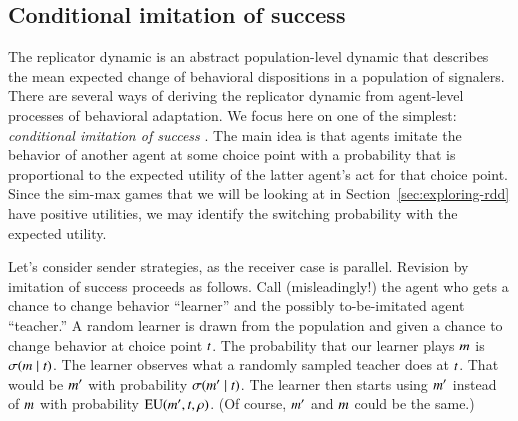 \documentclass[fleqn,reqno,10pt]{article}
\begin{document}
\subsection{Conditional imitation of success}
\label{sec:cond-imit-succ}

The replicator dynamic is an abstract population-level dynamic that describes the mean expected
change of behavioral dispositions in a population of signalers. There are several ways of
deriving the replicator dynamic from agent-level processes of behavioral adaptation. We focus
here on one of the simplest: \emph{conditional imitation of success} \citep[see][for this and
many other derivations]{Sandholm2010:Population-Game}. The main idea is that agents imitate the
behavior of another agent at some choice point with a probability that is proportional to the
expected utility of the latter agent's act for that choice point. Since the sim-max games that
we will be looking at in Section~\ref{sec:exploring-rdd} have positive utilities, we may
identify the switching probability with the expected utility.

Let's consider sender strategies, as the receiver case is parallel. Revision by imitation of
success proceeds as follows. Call (misleadingly!) the agent who gets a chance to change
behavior ``learner'' and the possibly to-be-imitated agent ``teacher.'' A random learner is
drawn from the population and given a chance to change behavior at choice point $t$. The
probability that our learner plays $m$ is $\sigma(m \mid t)$. The learner
observes what a randomly sampled teacher does at $t$. That would be $m'$ with
probability $\sigma(m' \mid t)$. The learner then starts using $m'$ instead
of $m$ with probability $\mathrm{EU}(m', t, \rho)$. (Of course, $m'$ and
$m$ could be the same.)
\end{document}
